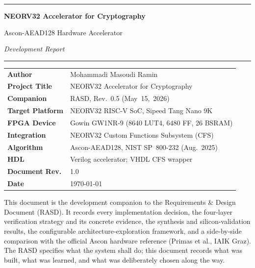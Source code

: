\documentclass[11pt,a4paper]{article}
\begin{document}
\begin{titlepage}
\centering
\vspace*{2cm}
{\color{docblue}\rule{\linewidth}{1.2pt}}
\vspace{0.4cm}\par
{\Huge\bfseries\color{docblue}NEORV32 Accelerator for Cryptography\par}
\vspace{0.4cm}
{\Large\color{doclblue}Ascon-AEAD128 Hardware Accelerator\par}
{\Large\color{doclblue}\textit{Development Report}\par}
\vspace{0.2cm}
{\color{docblue}\rule{\linewidth}{1.2pt}}
\vspace{2.2cm}\par

\begin{tabularx}{0.85\linewidth}{>{\bfseries\color{docblue}}lX}
Author             & Mohammadi Masoudi Ramin\\[2pt]
Project Title      & NEORV32 Accelerator for Cryptography\\[2pt]
Companion          & RASD, Rev.~0.5 (May~15,~2026)\\[2pt]
Target Platform    & NEORV32 RISC-V SoC, Sipeed Tang Nano 9K\\[2pt]
FPGA Device        & Gowin GW1NR-9 (8640 LUT4, 6480 FF, 26 BSRAM)\\[2pt]
Integration        & NEORV32 Custom Functions Subsystem (CFS)\\[2pt]
Algorithm          & Ascon-AEAD128, NIST SP~800-232 (Aug.~2025)\\[2pt]
HDL                & Verilog accelerator; VHDL CFS wrapper\\[2pt]
Document Rev.      & 1.0\\[2pt]
Date               & \today\\
\end{tabularx}

\vfill
\begin{tcolorbox}[colback=reqbg, colframe=reqframe, arc=2pt, width=0.9\linewidth]
\small
This document is the development companion to the Requirements \& Design
Document (RASD). It records every implementation decision, the four-layer
verification strategy and its concrete evidence, the synthesis and
silicon-validation results, the configurable architecture-exploration
framework, and a side-by-side comparison with the official Ascon
hardware reference (Primas et al., IAIK Graz). The RASD specifies what
the system shall do; this document records what was built, what was
learned, and what was deliberately chosen along the way.
\end{tcolorbox}
\vspace{1.2cm}
\end{titlepage}
\end{document}
